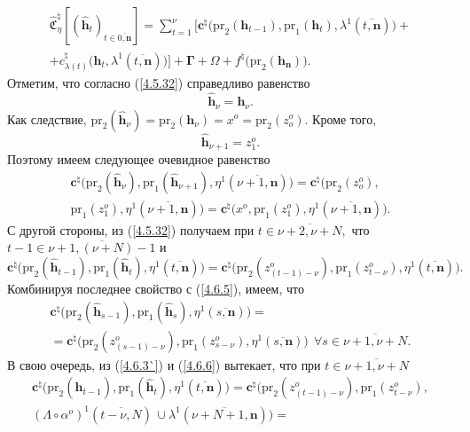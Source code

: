 \documentclass[11pt,twoside,openany]{report}
\newcommand{\ov}{\overline}
\newcommand{\La}{\Lambda}
\newcommand{\la}{\lambda}
\newcommand{\al}{\alpha}
\newcommand{\fa}{\forall}
\newcommand{\zc}{{\mathbf c}}
\newcommand{\nn}{{\mathbf n}}
\begin{document}
{{\begin{eqnarray}
&\widehat{\mathfrak{C}}_\eta^\natural[(\hat{\mathbf{h}}_t)_{t\in\ov{0,\nn}}]=
\sum\limits_{t=1}^\nu \bigl[\zc^\natural\bigl(\mathrm{pr}_2(\mathbf{h}_{t-1}),\mathrm{pr}_1(\mathbf{h}_t),
\la^1(\ov{t,\nn})\bigl) +
&\nonumber\\
&+c_{\la(t)}^\natural\bigl(\mathbf{h}_t,\la^1(\ov{t,\nn})\bigl)\bigl] +\mathbf{\Gamma} +
\Omega + f^\natural\bigl(\mathrm{pr}_2(\mathbf{h}_\nn)\bigl).
&\label{4.6.5``}
\end{eqnarray}
Отметим, что согласно (\ref{4.5.32}) справедливо равенство
$$
\hat{\mathbf{h}}_\nu = \mathbf{h}_\nu.
$$
Как следствие, $\mathrm{pr}_2(\hat{\mathbf{h}}_\nu) = \mathrm{pr}_2(\mathbf{h}_\nu) = x^o = \mathrm{pr}_2(z_o^o).$ Кроме того,
$$
\hat{\mathbf{h}}_{\nu+1} = z_1^o.
$$
Поэтому имеем следующее очевидное равенство
\begin{eqnarray}
&\zc^\natural\bigl(\mathrm{pr}_2(\hat{\mathbf{h}}_\nu),\mathrm{pr}_1
(\hat{\mathbf{h}}_{\nu+1}),\eta^1(\ov{\nu+1,\nn})\bigl)= \zc^\natural\bigl(\mathrm{pr}_2(z_o^o),
&\nonumber\\
&\mathrm{pr}_1 (z_1^o),\eta^1(\ov{\nu+1,\nn})\bigl)= \zc^\natural\bigl(x^o,\mathrm{pr}_1(z_1^o),
\eta^1(\ov{\nu+1,\nn})\bigl).
&\label{4.6.5}
\end{eqnarray}
С другой стороны, из (\ref{4.5.32}) получаем  при $t\in\ov{\nu+2,\nu+N},$ что $t-1 \in \ov{\nu+1,(\nu+N)- 1}$ и
$$
\zc^\natural\bigl(\mathrm{pr}_2(\hat{\mathbf{h}}_{t-1}),\mathrm{pr}_1(\hat{\mathbf{h}}_t),
\eta^1(\ov{t,\nn})\bigl) = \zc^\natural\bigl(\mathrm{pr}_2(z_{(t-1)-\nu}^o),\mathrm{pr}_1(z_{t-\nu}^o),
\eta^1(\ov{t,\nn})\bigl).
$$
Комбинируя последнее свойство с (\ref{4.6.5}), имеем, что
\begin{eqnarray}
&\zc^\natural\bigl(\mathrm{pr}_2(\hat{\mathbf{h}}_{s-1}),\mathrm{pr}_1
(\hat{\mathbf{h}}_s), \eta^1(\ov{s,\nn})\bigl)=
&\nonumber\\
&=\zc^\natural\bigl(\mathrm{pr}_2(z_{(s-1)-\nu}^o),\mathrm{pr}_1(z_{s-\nu}^o),
\eta^1(\ov{s,\nn})\bigl)\ \ \fa s\in \ov{\nu+1,\nu+N}.
\label{4.6.6}
\end{eqnarray}
В свою очередь, из (\ref{4.6.3`}) и (\ref{4.6.6}) вытекает, что при $t\in\ov{\nu+1,\nu+N}$
\begin{eqnarray}
&\zc^\natural\bigl(\mathrm{pr}_2(\hat{\mathbf{h}}_{t-1}),\mathrm{pr}_1
(\hat{\mathbf{h}}_t), \eta^1(\ov{t,\nn})\bigl)=
\zc^\natural\bigl(\mathrm{pr}_2(z_{(t-1)-\nu}^o),\mathrm{pr}_1(z_{t-\nu}^o),
&\nonumber\\
&(\La \circ \al^o)^1(\ov{t-\nu,N})\,\cup
\la^1(\ov{\nu+N+1,\nn})\bigl)=

\end{eqnarray}}}
\end{document}
